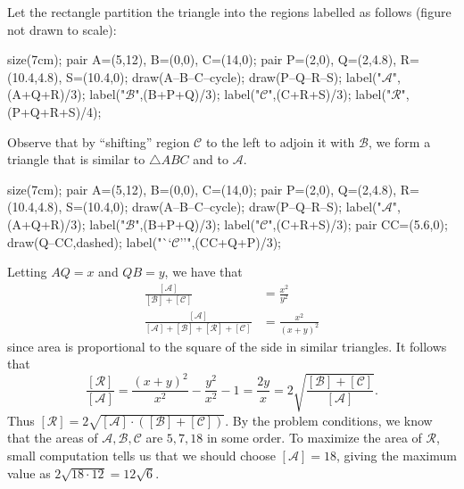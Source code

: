 Let the rectangle partition the triangle into the regions labelled as follows (figure not drawn to scale):
	\begin{center}
		\begin{asy}
			size(7cm);
			pair A=(5,12), B=(0,0), C=(14,0);
			pair P=(2,0), Q=(2,4.8), R=(10.4,4.8), S=(10.4,0);
			draw(A--B--C--cycle); draw(P--Q--R--S);
			label("$\mathcal{A}$",(A+Q+R)/3);
			label("$\mathcal{B}$",(B+P+Q)/3);
			label("$\mathcal{C}$",(C+R+S)/3);
			label("$\mathcal{R}$",(P+Q+R+S)/4);
		\end{asy}
	\end{center}
	Observe that by ``shifting'' region $\mathcal{C}$ to the left to adjoin it with $\mathcal{B}$, we form a triangle that is similar to $\triangle{ABC}$ and to $\mathcal{A}$.
	\begin{center}
		\begin{asy}
			size(7cm);
			pair A=(5,12), B=(0,0), C=(14,0);
			pair P=(2,0), Q=(2,4.8), R=(10.4,4.8), S=(10.4,0);
			draw(A--B--C--cycle); draw(P--Q--R--S);
			label("$\mathcal{A}$",(A+Q+R)/3);
			label("$\mathcal{B}$",(B+P+Q)/3);
			label("$\mathcal{C}$",(C+R+S)/3);
			pair CC=(5.6,0);
			draw(Q--CC,dashed);
			label("``$\mathcal{C}$''",(CC+Q+P)/3);
		\end{asy}
	\end{center}
	Letting $AQ=x$ and $QB=y$, we have that
	\begin{align*}
		\frac{[\mathcal{A}]}{[\mathcal{B}]+[\mathcal{C}]} &= \frac{x^2}{y^2} \\
		\frac{[\mathcal{A}]}{[\mathcal{A}]+[\mathcal{B}]+[\mathcal{R}]+[\mathcal{C}]} &= \frac{x^2}{(x+y)^2}
	\end{align*}
	since area is proportional to the square of the side in similar triangles. It follows that
	\[
		\frac{[\mathcal{R}]}{[\mathcal{A}]}=\frac{(x+y)^2}{x^2}-\frac{y^2}{x^2}-1=\frac{2y}{x}=2\sqrt{\frac{[\mathcal{B}]+[\mathcal{C}]}{[\mathcal{A}]}}.
	\]
	Thus $[\mathcal{R}]=2\sqrt{[\mathcal{A}]\cdot([\mathcal{B}]+[\mathcal{C}])}$. By the problem conditions, we know that the areas of $\mathcal{A},\mathcal{B},\mathcal{C}$ are $5,7,18$ in some order. To maximize the area of $\mathcal{R}$, small computation tells us that we should choose $[\mathcal{A}]=18$, giving the maximum value as $2\sqrt{18\cdot12}=12\sqrt{6}$.